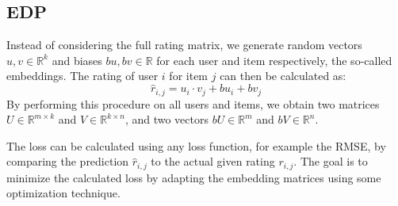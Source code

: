 \subsection{\ac{EDP} \cite{gupta_2020}}\label{sec: edp}

Instead of considering the full rating matrix, we generate random vectors $u, v\in \mathbb{R}^{k}$ and biases $bu, bv\in \mathbb{R}$ for each user and item respectively, the so-called embeddings. The rating of user $i$ for item $j$ can then be calculated as: 
\begin{equation}
    \hat{r}_{i,j} = u_{i} \cdot v_{j} + bu_i + bv_j
\end{equation}
By performing this procedure on all users and items, we obtain two matrices $U\in \mathbb{R}^{m \times k}$ and $V\in \mathbb{R}^{k \times n}$, and two vectors $bU\in \mathbb{R}^{m}$ and $bV\in \mathbb{R}^{n}$.

The loss can be calculated using any loss function, for example the \ac{RMSE}, by comparing the prediction $\hat{r}_{i,j}$ to the actual given rating $r_{i,j}$. The goal is to minimize the calculated loss by adapting the embedding matrices using some optimization technique. 